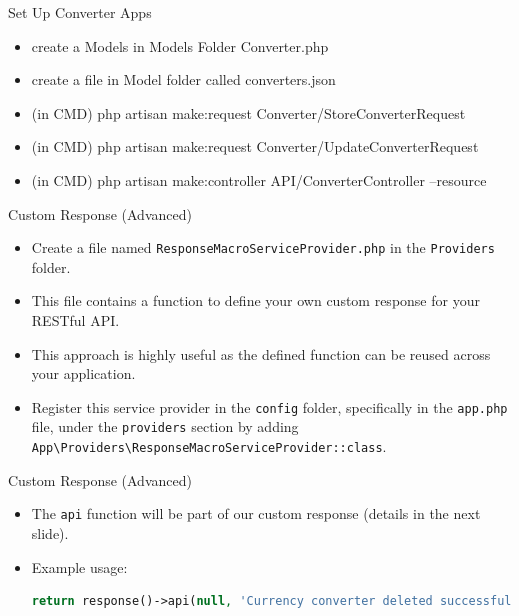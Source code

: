 \documentclass[aspectratio=169, table]{beamer}
\begin{document}
\begin{frame}[fragile]{Set Up Converter Apps}
    \begin{itemize}
        \item create a Models in Models Folder Converter.php
        \item create a file in Model folder called converters.json
        \item (in CMD) php artisan make:request Converter/StoreConverterRequest
        \item (in CMD) php artisan make:request Converter/UpdateConverterRequest
        \item (in CMD) php artisan make:controller API/ConverterController --resource
    \end{itemize}
\end{frame}

\begin{frame}[fragile]{Custom Response (Advanced)}
    \begin{itemize}
        \item Create a file named \texttt{ResponseMacroServiceProvider.php} in the \texttt{Providers} folder.
        \item This file contains a function to define your own custom response for your RESTful API.
        \item This approach is highly useful as the defined function can be reused across your application.
        \item Register this service provider in the \texttt{config} folder, specifically in the \texttt{app.php} file, under the \texttt{providers} section by adding \texttt{App\textbackslash Providers\textbackslash ResponseMacroServiceProvider::class}.
        
    \end{itemize}
\end{frame}

\begin{frame}[fragile]{Custom Response (Advanced)}
    \begin{itemize}
\item The \texttt{api} function will be part of our custom response (details in the next slide).
        \item Example usage:
        \begin{lstlisting}[language=PHP]
return response()->api(null, 'Currency converter deleted successfully', null, Response::HTTP_OK);
        \end{lstlisting}
    \end{itemize}
\end{frame}
\end{document}
